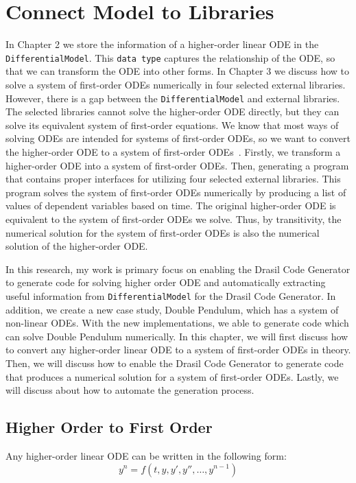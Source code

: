 \chapter{Connect Model to Libraries}
In Chapter 2 we store the information of a higher-order linear ODE in the \verb|DifferentialModel|. This \verb|data type| captures the relationship of the ODE, so that we can transform the ODE into other forms. In Chapter 3 we discuss how to solve a system of first-order ODEs numerically in four selected external libraries. However, there is a gap between the \verb|DifferentialModel| and external libraries. The selected libraries cannot solve the higher-order ODE directly, but they can solve its equivalent system of first-order equations. We know that most ways of solving ODEs are intended for systems of first-order ODEs, so we want to convert the higher-order ODE to a system of first-order ODEs~\citep{converthigherode}. Firstly, we transform a higher-order ODE into a system of first-order ODEs. Then, generating a program that contains proper interfaces for utilizing four selected external libraries. This program solves the system of first-order ODEs numerically by producing a list of values of dependent variables based on time. The original higher-order ODE is equivalent to the system of first-order ODEs we solve. Thus, by transitivity, the numerical solution for the system of first-order ODEs is also the numerical solution of the higher-order ODE.

In this research, my work is primary focus on enabling the Drasil Code Generator to generate code for solving higher order ODE and automatically extracting useful information from \verb|DifferentialModel| for the Drasil Code Generator. In addition, we create a new case study, Double Pendulum, which has a system of non-linear ODEs. With the new implementations, we able to generate code which can solve Double Pendulum numerically. In this chapter, we will first discuss how to convert any higher-order linear ODE to a system of first-order ODEs in theory. Then, we will discuss how to enable the Drasil Code Generator to generate code that produces a numerical solution for a system of first-order ODEs. Lastly, we will discuss about how to automate the generation process.

\section{Higher Order to First Order}
\label{se_hightofirst}
Any higher-order linear ODE can be written in the following form:
\begin{equation} \label{eq_isohighode}
  y^n = f (t, y, y', y'', \dots, y^{n-1})
\end{equation}

